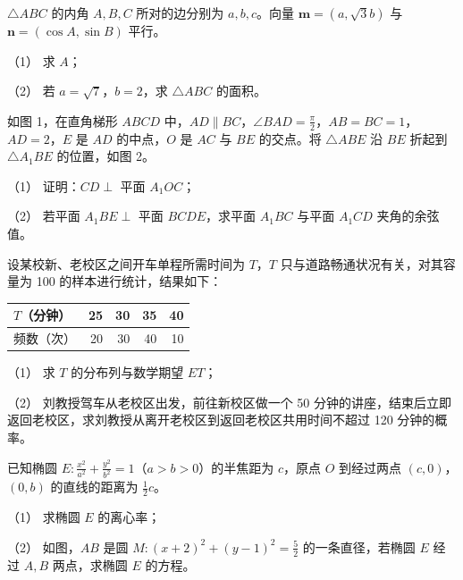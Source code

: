 \begin{question}

$\triangle ABC$ 的内角 $A,B,C$ 所对的边分别为 $a,b,c$。向量 $\boldsymbol m=(a,\sqrt3b)$ 与 $\boldsymbol n=(\cos A,\sin B)$ 平行。

（1） 求 $A$；

（2） 若 $a=\sqrt7$，$b=2$，求 $\triangle ABC$ 的面积。

\Needspace{0.4\textheight}
\end{question}
\begin{question}

如图 1，在直角梯形 $ABCD$ 中，$AD\parallel BC$，$\angle BAD=\frac\pi2$，$AB=BC=1$，$AD=2$，$E$ 是 $AD$ 的中点，$O$ 是 $AC$ 与 $BE$ 的交点。将 $\triangle ABE$ 沿 $BE$ 折起到 $\triangle A_1BE$ 的位置，如图 2。

（1） 证明：$CD\perp$ 平面 $A_1OC$；

（2） 若平面 $A_1BE\perp$ 平面 $BCDE$，求平面 $A_1BC$ 与平面 $A_1CD$ 夹角的余弦值。
\nopagebreak[4]
\begin{center}\end{center}
\nopagebreak[4]
\end{question}
\begin{question}

设某校新、老校区之间开车单程所需时间为 $T$，$T$ 只与道路畅通状况有关，对其容量为 100 的样本进行统计，结果如下：

\begin{center}
\begin{tabular}{lrrrr}
\toprule
$T$（分钟） & 25 & 30 & 35 & 40 \\
\midrule
频数（次） & 20 & 30 & 40 & 10 \\
\bottomrule
\end{tabular}
\end{center}

（1） 求 $T$ 的分布列与数学期望 $ET$；

（2） 刘教授驾车从老校区出发，前往新校区做一个 50 分钟的讲座，结束后立即返回老校区，求刘教授从离开老校区到返回老校区共用时间不超过 120 分钟的概率。

\Needspace{0.4\textheight}
\end{question}
\begin{question}

已知椭圆 $E:\frac{x^2}{a^2}+\frac{y^2}{b^2}=1$（$a>b>0$）的半焦距为 $c$，原点 $O$ 到经过两点 $(c,0)$，$(0,b)$ 的直线的距离为 $\frac12c$。

（1） 求椭圆 $E$ 的离心率；

（2） 如图，$AB$ 是圆 $M:(x+2)^2+(y-1)^2=\frac52$ 的一条直径，若椭圆 $E$ 经过 $A,B$ 两点，求椭圆 $E$ 的方程。
\nopagebreak[4]
\begin{center}\end{center}
\nopagebreak[4]
\end{question}
